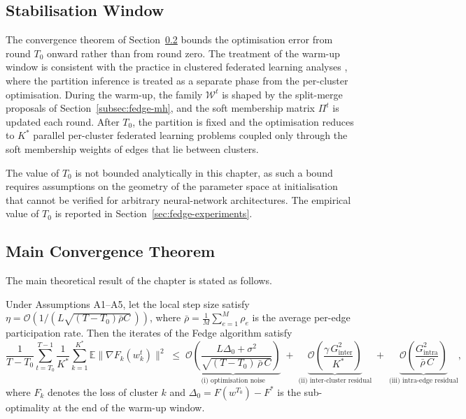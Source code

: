 \subsection{Stabilisation Window}
\label{subsec:fedge-stab}

The convergence theorem of Section~\ref{subsec:fedge-theorem} bounds the optimisation error from round $T_{0}$ onward rather than from round zero. The treatment of the warm-up window is consistent with the practice in clustered federated learning analyses \cite{sattler2020clustered, jaramillo2026dpmmcfl}, where the partition inference is treated as a separate phase from the per-cluster optimisation. During the warm-up, the family $\mathcal{W}^{t}$ is shaped by the split-merge proposals of Section~\ref{subsec:fedge-mh}, and the soft membership matrix $\Pi^{t}$ is updated each round. After $T_{0}$, the partition is fixed and the optimisation reduces to $K^{*}$ parallel per-cluster federated learning problems coupled only through the soft membership weights of edges that lie between clusters.

The value of $T_{0}$ is not bounded analytically in this chapter, as such a bound requires assumptions on the geometry of the parameter space at initialisation that cannot be verified for arbitrary neural-network architectures. The empirical value of $T_{0}$ is reported in Section~\ref{sec:fedge-experiments}.

\subsection{Main Convergence Theorem}
\label{subsec:fedge-theorem}

The main theoretical result of the chapter is stated as follows.

\begin{theorem}
\label{thm:fedge-convergence}
Under Assumptions A1--A5, let the local step size satisfy $\eta = \mathcal{O}\!\left( 1 / (L\sqrt{(T - T_{0}) \bar{\rho} C} \,) \right)$, where $\bar{\rho} = \frac{1}{M}\sum_{e=1}^{M} \rho_{e}$ is the average per-edge participation rate. Then the iterates of the Fedge algorithm satisfy
\begin{equation}
\label{eq:main-bound}
\frac{1}{T - T_{0}} \sum_{t = T_{0}}^{T-1} \frac{1}{K^{*}} \sum_{k=1}^{K^{*}} \mathbb{E} \big\| \nabla F_{k}(w_{k}^{t}) \big\|^{2}
\;\leq\;
\underbrace{\mathcal{O}\!\left( \frac{L \Delta_{0} + \sigma^{2}}{\sqrt{(T - T_{0}) \, \bar{\rho} \, C}} \right)}_{\text{(i) optimisation noise}}
\;+\;
\underbrace{\mathcal{O}\!\left( \frac{\gamma \, G_{\text{inter}}^{2}}{K^{*}} \right)}_{\text{(ii) inter-cluster residual}}
\;+\;
\underbrace{\mathcal{O}\!\left( \frac{G_{\text{intra}}^{2}}{\bar{\rho} \, C} \right)}_{\text{(iii) intra-edge residual}},
\end{equation}
where $F_{k}$ denotes the loss of cluster $k$ and $\Delta_{0} = F(w^{T_{0}}) - F^{*}$ is the sub-optimality at the end of the warm-up window.
\end{theorem}

